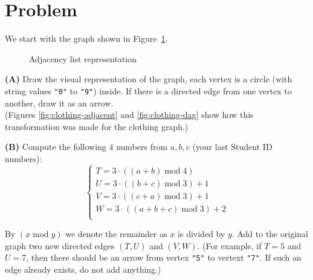 \documentclass[a4paper,12pt]{article}
\begin{document}
\section{Problem}

We start with the graph shown in Figure~\ref{fig:problem-adjacent}.

\begin{figure}[!htb]
\caption{\label{fig:problem-adjacent} Adjacency list representation}
\end{figure}

\vspace{10pt}
{\bf (A)} Draw the visual representation of the graph, 
each vertex is a circle (with string values {\tt "0"} to {\tt "9"})
inside. If there is a directed edge from one vertex to another, 
draw it as an arrow.\\
(Figures \ref{fig:clothing-adjacent} and \ref{fig:clothing-dag} show
how this transformation was made for the clothing graph.)

\vspace{10pt}
{\bf (B)} Compute the following $4$ numbers from $a,b,c$ (your last 
Student ID numbers): 
$$\left\{ \begin{array}{l}
T = 3 \cdot ((a+b)\;\text{mod}\;4)\\
U = 3 \cdot ((b+c)\;\text{mod}\;3)+1\\
V = 3 \cdot ((c+a)\;\text{mod}\;3)+1\\
W = 3 \cdot ((a+b+c)\;\text{mod}\;3)+2\\
\end{array} \right.$$

By $(x\;\text{mod}\;y)$ we denote the remainder as $x$ is divided by $y$. 
Add to the original graph two new directed edges $(T,U)$ and $(V,W)$. 
(For example, if $T = 5$ and $U = 7$, then there should be an arrow from 
vertex {\tt "5"} to vertext {\tt "7"}. If such an edge already exists, do 
not add anything.)
\end{document}
